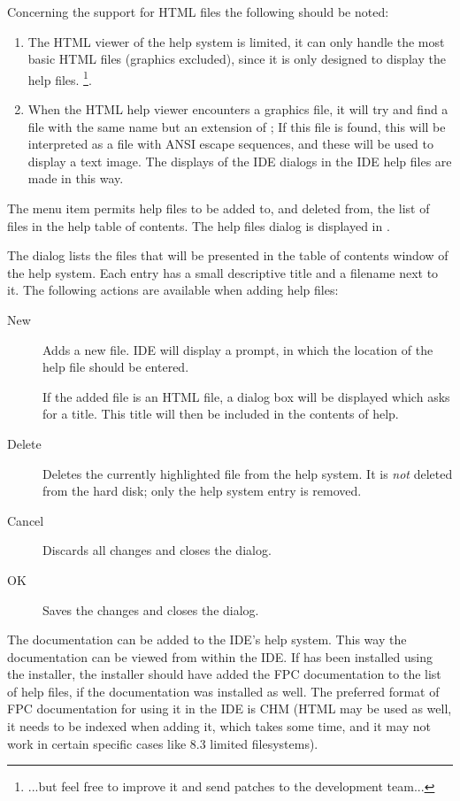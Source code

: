 \begin{remark}
Concerning the support for HTML files the following should be noted:
\begin{enumerate}
\item
The HTML viewer of the  help system is limited, it can only handle the
most basic HTML files (graphics excluded), since it is only designed
to display the \fpc help files. \footnote{...but feel free to improve it and send patches to the
\fpc development team...}.
\item
When the HTML help viewer encounters a graphics file, it will try and find a
file with the same name but an extension of ; If this file is
found, this will be interpreted as a file with ANSI escape sequences, and
these will be used to display a text image. The displays of the IDE dialogs
in the IDE help files are made in this way.
\end{enumerate}
\end{remark}

The menu item  permits help files to be added to, 
and deleted from, the list of files in the help table of contents.
The help files dialog is displayed in .


The dialog lists the files that will be presented in the table of contents
window of the help system. Each entry has a small descriptive title and a
filename next to it. The following actions are available when adding help
files:
\begin{description}
\item[New] Adds a new file. IDE will display a prompt, in which the
location of the help file should be entered.

If the added file is an HTML file, a dialog box will be displayed
which asks for a title. This title will then be included in the
contents of help.
\item[Delete] Deletes the currently highlighted file from the help system.
It is \emph{not} deleted from the hard disk; only the help system entry is
removed.
\item[Cancel] Discards all changes and closes the dialog.
\item[OK] Saves the changes and closes the dialog.
\end{description}

The \fpc documentation can be added to the IDE's help system.
This way the documentation can be viewed from within the IDE. If \fpc has
been installed using the installer, the installer should have added the
FPC documentation to the list of help files, if the documentation was
installed as well. The preferred format of FPC documentation for using it
in the IDE is CHM (HTML may be used as well, it needs to be indexed when
adding it, which takes some time, and it may not work in certain specific
cases like 8.3 limited filesystems).

